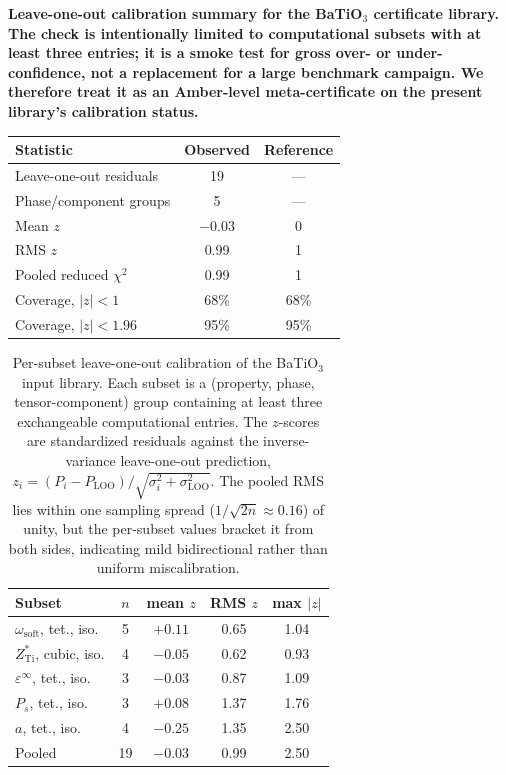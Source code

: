 \documentclass[onecolumn,superscriptaddress,amsmath,amssymb,longbibliography]{revtex4-2}
\begin{document}
\begin{center}
\textbf{Leave-one-out calibration summary for the BaTiO$_3$ certificate
library. The check is intentionally limited to computational subsets with at
least three entries; it is a smoke test for gross over- or under-confidence,
not a replacement for a large benchmark campaign. We therefore treat it as an
Amber-level meta-certificate on the present library's calibration status.}\\[0.5em]
\begin{tabular}{lcc}
\toprule
Statistic & Observed & Reference \\
\midrule
Leave-one-out residuals & 19 & --- \\
Phase/component groups & 5 & --- \\
Mean $z$ & $-0.03$ & 0 \\
RMS $z$ & 0.99 & 1 \\
Pooled reduced $\chi^2$ & 0.99 & 1 \\
Coverage, $|z|<1$ & 68\% & 68\% \\
Coverage, $|z|<1.96$ & 95\% & 95\% \\
\bottomrule
\end{tabular}
\end{center}

\begin{table}
\caption{Per-subset leave-one-out calibration of the BaTiO$_3$ input library.
Each subset is a (property, phase, tensor-component) group containing at least
three exchangeable computational entries. The $z$-scores are standardized
residuals against the inverse-variance leave-one-out prediction,
$z_i = (P_i - P_{\mathrm{LOO}})/\sqrt{\sigma_i^2 + \sigma_{\mathrm{LOO}}^2}$.
The pooled RMS lies within one sampling spread ($1/\sqrt{2n}\approx0.16$) of
unity, but the per-subset values bracket it from both sides, indicating mild
bidirectional rather than uniform miscalibration.}
\label{tab:loo_calibration}
\begin{tabular}{lcccc}
\toprule
Subset & $n$ & mean $z$ & RMS $z$ & max $|z|$ \\
\midrule
$\omega_{\mathrm{soft}}$, tet., iso. & 5 & $+0.11$ & 0.65 & 1.04 \\
$Z^*_{\mathrm{Ti}}$, cubic, iso.     & 4 & $-0.05$ & 0.62 & 0.93 \\
$\varepsilon^\infty$, tet., iso.     & 3 & $-0.03$ & 0.87 & 1.09 \\
$P_s$, tet., iso.                    & 3 & $+0.08$ & 1.37 & 1.76 \\
$a$, tet., iso.                      & 4 & $-0.25$ & 1.35 & 2.50 \\
\midrule
Pooled                               & 19 & $-0.03$ & 0.99 & 2.50 \\
\bottomrule
\end{tabular}
\end{table}
\end{document}
